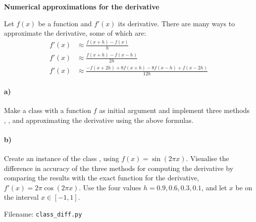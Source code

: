 \begin{Problem}{\textbf{Numerical approximations for the derivative}} \label{prob74}

\noindent Let $f(x)$ be a function and $f'(x)$ its derivative. There are many ways to
approximate the derivative, some of which are:
\begin{align*} 
    f'(x) &\approx  \frac{f(x+h)-f(x)}{h} \\
    f'(x) &\approx  \frac{f(x+h)-f(x-h)}{2h} \\
    f'(x) &\approx  \frac{-f(x+2h)+8f(x+h)-8f(x-h)+f(x-2h)}{12h}
\end{align*}
\paragraph{a)}
Make a class  with a function $f$ as initial argument and implement
three methods , , and 
approximating the derivative using the above formulas.


\paragraph{b)}
Create an instance of the class , using $f(x) = \sin\left( 2 \pi x \right)$. Visualise the difference in accuracy of the three methods for computing the derivative by comparing the results with the exact function for the derivative, $f'(x) = 2 \pi \cos(2 \pi x)$. Use the four values  $h = 0.9, 0.6, 0.3, 0.1$, and let $x$ be on the interval $x \in [-1, 1]$. 

Filename: \texttt{class\_diff.py}
\end{Problem}

